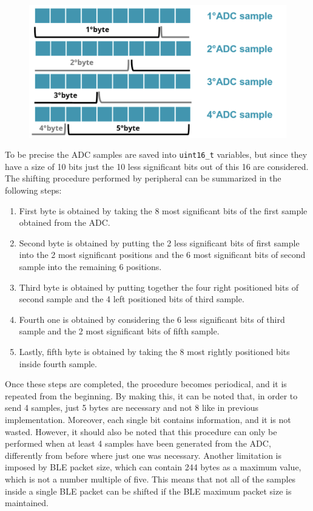 \documentclass{Configuration_Files/PoliMi3i_thesis}
\begin{document}
\begin{figure}[H]
    \centering
    \includegraphics[scale=0.7]{Shift Algorithm/Screenshot 2024-07-22 at 22.31.36.png}
    \label{fig:pairing_procedure}
\end{figure}

To be precise the ADC samples are saved into \texttt{uint16\_t} variables, but since they have a size of 10 bits just the 10 less significant bits out of this 16 are considered. The shifting procedure performed by peripheral can be summarized in the following steps:

\begin{enumerate}
    \item First byte is obtained by taking the 8 most significant bits of the first sample obtained from the ADC.
    \item Second byte is obtained by putting the 2 less significant bits of first sample into the 2 most significant positions and the 6 most significant bits of second sample into the remaining 6 positions.
    \item Third byte is obtained by putting together the four right positioned bits of second sample and the 4 left positioned bits of third sample.
    \item Fourth one is obtained by considering the 6 less significant bits of third sample and the 2 most significant bits of fifth sample.
    \item Lastly, fifth byte is obtained by taking the 8 most rightly positioned bits inside fourth sample.
\end{enumerate}

Once these steps are completed, the procedure becomes periodical, and it is repeated from the beginning. By making this, it can be noted that, in order to send 4 samples, just 5 bytes are necessary and not 8 like in previous implementation. Moreover, each single bit contains information, and it is not wasted. However, it should also be noted that this procedure can only be performed when at least 4 samples have been generated from the ADC, differently from before where just one was necessary. Another limitation is imposed by BLE packet size, which can contain 244 bytes as a maximum value, which is not a number multiple of five. This means that not all of the samples inside a single BLE packet can be shifted if the BLE maximum packet size is maintained.
\end{document}
